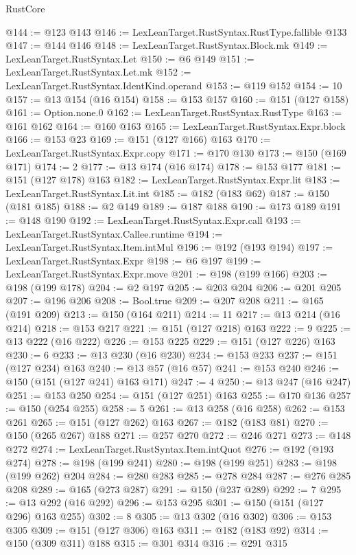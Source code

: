 \begin{lexlean}{RustCore}
\begin{coremodule}
@144 := @123 @143
@146 := LexLeanTarget.RustSyntax.RustType.fallible @133
@147 := @144 @146
@148 := LexLeanTarget.RustSyntax.Block.mk
@149 := LexLeanTarget.RustSyntax.Let
@150 := @6 @149
@151 := LexLeanTarget.RustSyntax.Let.mk
@152 := LexLeanTarget.RustSyntax.IdentKind.operand
@153 := @119 @152
@154 := 10
@157 := @13 @154 (@16 @154)
@158 := @153 @157
@160 := @151 (@127 @158)
@161 := Option.none.{0}
@162 := LexLeanTarget.RustSyntax.RustType
@163 := @161 @162
@164 := @160 @163
@165 := LexLeanTarget.RustSyntax.Expr.block
@166 := @153 @23
@169 := @151 (@127 @166) @163
@170 := LexLeanTarget.RustSyntax.Expr.copy
@171 := @170 @130
@173 := @150 (@169 @171)
@174 := 2
@177 := @13 @174 (@16 @174)
@178 := @153 @177
@181 := @151 (@127 @178) @163
@182 := LexLeanTarget.RustSyntax.Expr.lit
@183 := LexLeanTarget.RustSyntax.Lit.int
@185 := @182 (@183 @62)
@187 := @150 (@181 @185)
@188 := @2 @149
@189 := @187 @188
@190 := @173 @189
@191 := @148 @190
@192 := LexLeanTarget.RustSyntax.Expr.call
@193 := LexLeanTarget.RustSyntax.Callee.runtime
@194 := LexLeanTarget.RustSyntax.Item.intMul
@196 := @192 (@193 @194)
@197 := LexLeanTarget.RustSyntax.Expr
@198 := @6 @197
@199 := LexLeanTarget.RustSyntax.Expr.move
@201 := @198 (@199 @166)
@203 := @198 (@199 @178)
@204 := @2 @197
@205 := @203 @204
@206 := @201 @205
@207 := @196 @206
@208 := Bool.true
@209 := @207 @208
@211 := @165 (@191 @209)
@213 := @150 (@164 @211)
@214 := 11
@217 := @13 @214 (@16 @214)
@218 := @153 @217
@221 := @151 (@127 @218) @163
@222 := 9
@225 := @13 @222 (@16 @222)
@226 := @153 @225
@229 := @151 (@127 @226) @163
@230 := 6
@233 := @13 @230 (@16 @230)
@234 := @153 @233
@237 := @151 (@127 @234) @163
@240 := @13 @57 (@16 @57)
@241 := @153 @240
@246 := @150 (@151 (@127 @241) @163 @171)
@247 := 4
@250 := @13 @247 (@16 @247)
@251 := @153 @250
@254 := @151 (@127 @251) @163
@255 := @170 @136
@257 := @150 (@254 @255)
@258 := 5
@261 := @13 @258 (@16 @258)
@262 := @153 @261
@265 := @151 (@127 @262) @163
@267 := @182 (@183 @81)
@270 := @150 (@265 @267) @188
@271 := @257 @270
@272 := @246 @271
@273 := @148 @272
@274 := LexLeanTarget.RustSyntax.Item.intQuot
@276 := @192 (@193 @274)
@278 := @198 (@199 @241)
@280 := @198 (@199 @251)
@283 := @198 (@199 @262) @204
@284 := @280 @283
@285 := @278 @284
@287 := @276 @285 @208
@289 := @165 (@273 @287)
@291 := @150 (@237 @289)
@292 := 7
@295 := @13 @292 (@16 @292)
@296 := @153 @295
@301 := @150 (@151 (@127 @296) @163 @255)
@302 := 8
@305 := @13 @302 (@16 @302)
@306 := @153 @305
@309 := @151 (@127 @306) @163
@311 := @182 (@183 @92)
@314 := @150 (@309 @311) @188
@315 := @301 @314
@316 := @291 @315

\end{coremodule}
\end{lexlean}

